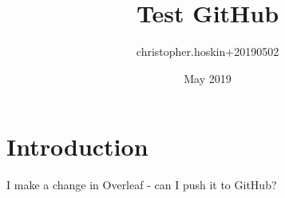\documentclass{article}
\title{Test GitHub}
\author{christopher.hoskin+20190502 }
\date{May 2019}
\begin{document}
\maketitle

\section{Introduction}

I make a change in Overleaf - can I push it to GitHub?
\end{document}
